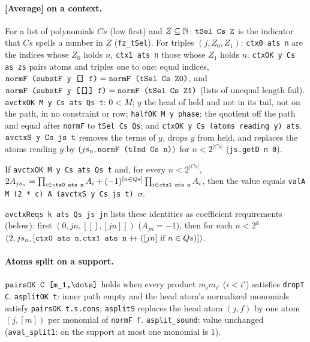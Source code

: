 \paragraph{[Average] on a context.} For a list of polynomials $Cs$ (low first) and
$Z\subseteq\mathbb{N}$: $\textnormal{\texttt{tSel Cs Z}}$ is the indicator that $Cs$ spells a number in $Z$
(\textnormal{\texttt{fz\_\allowbreak{}tSel}}). For triples $(j,Z_0,Z_1)$: \textnormal{\texttt{ctx0 ats n}} are the indices whose $Z_0$ holds
$n$, \textnormal{\texttt{ctx1 ats n}} those whose $Z_1$ holds $n$. \textnormal{\texttt{ctxOK y Cs as zs}} pairs atoms and
triples one to one: equal indices, $\textnormal{\texttt{normF (\allowbreak{}substF y [] f)}} = \textnormal{\texttt{normF (\allowbreak{}tSel Cs Z0)}}$, and
$\textnormal{\texttt{normF (\allowbreak{}substF y [[]] f)}} = \textnormal{\texttt{normF (\allowbreak{}tSel Cs Z1)}}$ (lists of unequal length fail).
\textnormal{\texttt{avctxOK M y Cs ats Qs t}}: $0<M$; $y$ the head of held and not in its tail, not on the path, in
no constraint or row; \textnormal{\texttt{halfOK M y phase}}; the quotient off the path and equal after
\textnormal{\texttt{normF}} to \textnormal{\texttt{tSel Cs Qs}}; and \textnormal{\texttt{ctxOK y Cs (\allowbreak{}atoms reading y) ats}}.
$\textnormal{\texttt{avctxS y Cs js t}}$ removes the terms of $y$, drops $y$ from held, and replaces the atoms
reading $y$ by $(js_n, \textnormal{\texttt{normF (\allowbreak{}tInd Cs n)}})$ for $n<2^{|Cs|}$ (\textnormal{\texttt{js.\allowbreak{}getD n 0}}).
\begin{theorem}
If \textnormal{\texttt{avctxOK M y Cs ats Qs t}} and, for every $n<2^{|Cs|}$,
$2A_{js_n} = \prod_{i\in\textnormal{\texttt{ctx0 ats n}}}A_i + (-1)^{[n\in Qs]}\prod_{i\in\textnormal{\texttt{ctx1 ats n}}}A_i$,
then the value equals \textnormal{\texttt{valA M (\allowbreak{}2 * c) A (\allowbreak{}avctxS y Cs js t) \ensuremath{\sigma}}}.
\end{theorem}
\noindent \textnormal{\texttt{avctxReqs k ats Qs js jn}} lists these identities as coefficient requirements
(below): first $(0,jn,[[],[jn]])$ ($A_{jn}=-1$), then for each $n<2^k$
$(2, js_n, [\textnormal{\texttt{ctx0 ats n}}, \textnormal{\texttt{ctx1 ats n}} \mathbin{+\!\!+} ([jn]\text{ if } n\in Qs)])$.

\paragraph{Atoms split on a support.} $\textnormal{\texttt{pairsOK C [m\_\allowbreak{}1,\allowbreak{}\textbackslash{}dots]}}$ holds when every product
$m_im_{i'}$ ($i<i'$) satisfies \textnormal{\texttt{dropT C}}. \textnormal{\texttt{asplitOK t}}: inner path empty and the head
atom's normalized monomials satisfy \textnormal{\texttt{pairsOK t.\allowbreak{}s.\allowbreak{}cons}}; \textnormal{\texttt{asplitS}} replaces the head atom
$(j,f)$ by one atom $(j,[m])$ per monomial of \textnormal{\texttt{normF f}}. \textnormal{\texttt{asplit\_\allowbreak{}sound}}: value
unchanged (\textnormal{\texttt{aval\_\allowbreak{}split1}}: on the support at most one monomial is $1$).

